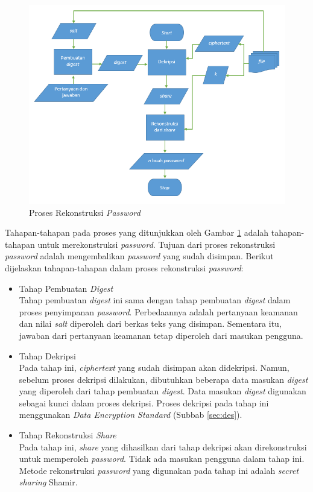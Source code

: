 \begin{figure}[h]
	\centerline{\includegraphics[scale=0.6]{Gambar/flowchart_reconstruct}}
	\caption{Proses Rekonstruksi \textit{Password}}\label{fig:flowchart_reconstruct_secret}
\end{figure}

Tahapan-tahapan pada proses yang ditunjukkan oleh Gambar \ref{fig:flowchart_reconstruct_secret} adalah tahapan-tahapan untuk merekonstruksi \textit{password}. Tujuan dari proses rekonstruksi \textit{password} adalah mengembalikan \textit{password} yang sudah disimpan. Berikut dijelaskan tahapan-tahapan dalam proses rekonstruksi \textit{password}:

\begin{itemize}
	\item Tahap Pembuatan \textit{Digest} \\
	Tahap pembuatan \textit{digest} ini sama dengan tahap pembuatan \textit{digest} dalam proses penyimpanan \textit{password}. Perbedaannya adalah pertanyaan keamanan dan nilai \textit{salt} diperoleh dari berkas teks yang disimpan. Sementara itu, jawaban dari pertanyaan keamanan tetap diperoleh dari masukan pengguna.
	\item Tahap Dekripsi \\
	Pada tahap ini, \textit{ciphertext} yang sudah disimpan akan didekripsi. Namun, sebelum proses dekripsi dilakukan, dibutuhkan beberapa data masukan \textit{digest} yang diperoleh dari tahap pembuatan \textit{digest}. Data masukan \textit{digest} digunakan sebagai kunci dalam proses dekripsi. Proses dekripsi pada tahap ini menggunakan \textit{Data Encryption Standard} (Subbab \ref{sec:des}).
	\item Tahap Rekonstruksi \textit{Share} \\
	Pada tahap ini, \textit{share} yang dihasilkan dari tahap dekripsi akan direkonstruksi untuk memperoleh \textit{password}. Tidak ada masukan pengguna dalam tahap ini. Metode rekonstruksi \textit{password} yang digunakan pada tahap ini adalah \textit{secret sharing} Shamir.
\end{itemize}

